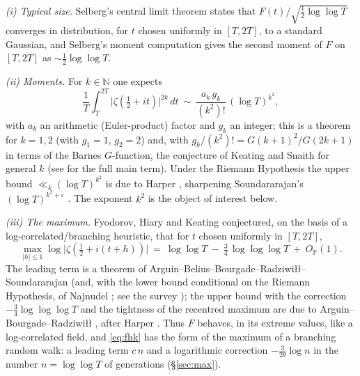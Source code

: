 \documentclass[11pt]{amsart}
\theoremstyle{definition}
\newcommand{\NN}{\mathbb N}
\newcommand{\Pp}{\mathbb P}
\newcommand{\half}{\tfrac12}
\newcommand{\loglog}{\log\log}
\newcommand{\llll}{\log\log\log}
\begin{document}
\emph{(i) Typical size.} Selberg's central limit theorem \cite{Selberg} states that $F(t)/\sqrt{\half\loglog T}$
converges in distribution, for $t$ chosen uniformly in $[T,2T]$, to a standard Gaussian, and Selberg's moment
computation gives the second moment of $F$ on $[T,2T]$ as $\sim\half\loglog T$.

\emph{(ii) Moments.} For $k\in\NN$ one expects
\[
\frac1T\int_T^{2T}\bigl|\zeta(\half+it)\bigr|^{2k}\,dt\ \sim\ \frac{a_k\,g_k}{(k^2)!}\,(\log T)^{k^2},
\]
with $a_k$ an arithmetic (Euler-product) factor and $g_k$ an integer; this is a theorem for $k=1,2$
\cite{HL,Ingham} (with $g_1=1$, $g_2=2$) and, with $g_k/(k^2)!=G(k+1)^2/G(2k+1)$ in terms of the Barnes
$G$-function, the conjecture of Keating and Snaith \cite{KS} for general $k$ (see \cite{CFKRS} for the full main
term). Under the Riemann Hypothesis the upper bound $\ll_k(\log T)^{k^2}$ is due to Harper \cite{HarperMoments},
sharpening Soundararajan's $(\log T)^{k^2+\varepsilon}$ \cite{Sound}. The exponent $k^2$ is the object of interest
below.

\emph{(iii) The maximum.} Fyodorov, Hiary and Keating \cite{FHK,FK} conjectured, on the basis of a
log-correlated/branching heuristic, that for $t$ chosen uniformly in $[T,2T]$,
\begin{equation}\label{eq:fhk}
\max_{|h|\le1}\log\bigl|\zeta(\half+i(t+h))\bigr|\ =\ \loglog T\ -\ \tfrac34\,\llll T\ +\ O_{\Pp}(1).
\end{equation}
The leading term is a theorem of Arguin--Belius--Bourgade--Radziwi{\l}{\l}--Soundararajan \cite{ABBRS} (and, with
the lower bound conditional on the Riemann Hypothesis, of Najnudel \cite{Najnudel}; see the survey
\cite{HarperBourbaki}); the upper bound with the correction $-\tfrac34\llll T$ and the tightness of the recentred
maximum are due to Arguin--Bourgade--Radziwi{\l}{\l} \cite{ABR1,ABR2}, after Harper \cite{HarperFHK}. Thus $F$
behaves, in its extreme values, like a log-correlated field, and \eqref{eq:fhk} has the form of the maximum of a
branching random walk: a leading term $c\,n$ and a logarithmic correction $-\frac{3}{2\theta}\log n$ in the number
$n=\loglog T$ of generations (\S\ref{sec:max}).
\end{document}
